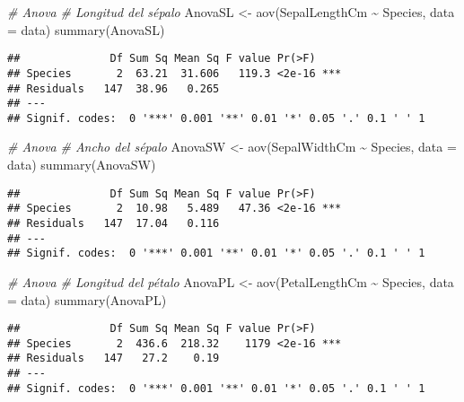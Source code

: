 \documentclass[
]{article}
\newenvironment{Shaded}{\begin{snugshade}}{\end{snugshade}}
\newcommand{\AttributeTok}[1]{\textcolor[rgb]{0.77,0.63,0.00}{#1}}
\newcommand{\CommentTok}[1]{\textcolor[rgb]{0.56,0.35,0.01}{\textit{#1}}}
\newcommand{\FunctionTok}[1]{\textcolor[rgb]{0.00,0.00,0.00}{#1}}
\newcommand{\NormalTok}[1]{#1}
\newcommand{\OtherTok}[1]{\textcolor[rgb]{0.56,0.35,0.01}{#1}}
\newcommand{\SpecialCharTok}[1]{\textcolor[rgb]{0.00,0.00,0.00}{#1}}
\begin{document}
\begin{Shaded}
\begin{Highlighting}[]
\CommentTok{\# Anova}
\CommentTok{\# Longitud del sépalo}
\NormalTok{AnovaSL }\OtherTok{\textless{}{-}} \FunctionTok{aov}\NormalTok{(SepalLengthCm }\SpecialCharTok{\textasciitilde{}}\NormalTok{ Species, }\AttributeTok{data =}\NormalTok{ data)}
\FunctionTok{summary}\NormalTok{(AnovaSL)}
\end{Highlighting}
\end{Shaded}

\begin{verbatim}
##              Df Sum Sq Mean Sq F value Pr(>F)    
## Species       2  63.21  31.606   119.3 <2e-16 ***
## Residuals   147  38.96   0.265                   
## ---
## Signif. codes:  0 '***' 0.001 '**' 0.01 '*' 0.05 '.' 0.1 ' ' 1
\end{verbatim}

\begin{Shaded}
\begin{Highlighting}[]
\CommentTok{\# Anova}
\CommentTok{\# Ancho del sépalo}
\NormalTok{AnovaSW }\OtherTok{\textless{}{-}} \FunctionTok{aov}\NormalTok{(SepalWidthCm }\SpecialCharTok{\textasciitilde{}}\NormalTok{ Species, }\AttributeTok{data =}\NormalTok{ data)}
\FunctionTok{summary}\NormalTok{(AnovaSW)}
\end{Highlighting}
\end{Shaded}

\begin{verbatim}
##              Df Sum Sq Mean Sq F value Pr(>F)    
## Species       2  10.98   5.489   47.36 <2e-16 ***
## Residuals   147  17.04   0.116                   
## ---
## Signif. codes:  0 '***' 0.001 '**' 0.01 '*' 0.05 '.' 0.1 ' ' 1
\end{verbatim}

\begin{Shaded}
\begin{Highlighting}[]
\CommentTok{\# Anova}
\CommentTok{\# Longitud del pétalo}
\NormalTok{AnovaPL }\OtherTok{\textless{}{-}} \FunctionTok{aov}\NormalTok{(PetalLengthCm }\SpecialCharTok{\textasciitilde{}}\NormalTok{ Species, }\AttributeTok{data =}\NormalTok{ data)}
\FunctionTok{summary}\NormalTok{(AnovaPL)}
\end{Highlighting}
\end{Shaded}

\begin{verbatim}
##              Df Sum Sq Mean Sq F value Pr(>F)    
## Species       2  436.6  218.32    1179 <2e-16 ***
## Residuals   147   27.2    0.19                   
## ---
## Signif. codes:  0 '***' 0.001 '**' 0.01 '*' 0.05 '.' 0.1 ' ' 1
\end{verbatim}
\end{document}
